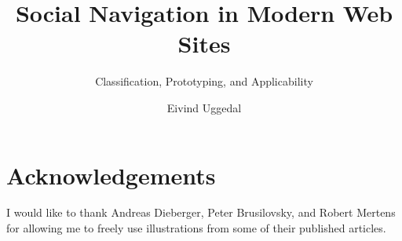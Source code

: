 \documentclass[12pt,a4paper]{uiothesis}
\title{Social Navigation in Modern Web Sites}
\subtitle{Classification, Prototyping, and Applicability}
\author{Eivind Uggedal}
\begin{document}
  \pagestyle{uio}

  \frontmatter
    \maketitle
    \cleardoublepage
    \tableofcontents
    \cleardoublepage
    \listoffigures
    \cleardoublepage
    \listoftables
    \chapter{Acknowledgements}
    I would like to thank
    Andreas Dieberger,
    Peter Brusilovsky, and
    Robert Mertens
    for allowing me to freely use illustrations from
    some of their published articles.

  \mainmatter
    
    
    
    
    
    

    \begin{appendices}
      
    \end{appendices}

  \backmatter
    
    
\end{document}
